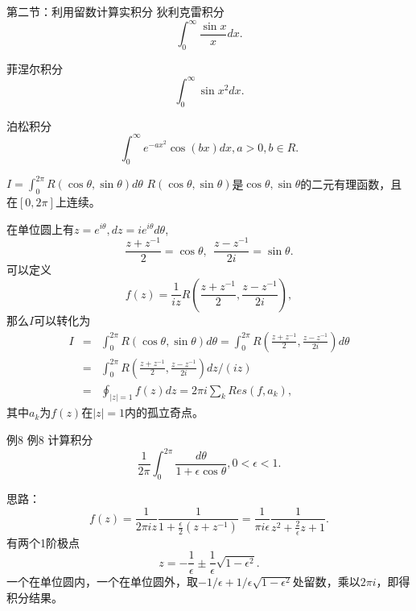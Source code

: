 \documentclass[11pt]{beamer}
\newcommand{\kong}[1][0.5]{\vspace{#1cm}}
\begin{document}
\begin{frame}{第二节：利用留数计算实积分}
狄利克雷积分
\begin{equation}
\int^\infty_0 \frac{\sin x}{x} dx.
\end{equation}

\kong[0.5]
菲涅尔积分
\begin{equation}
\int^\infty_0 \sin x^2 dx.
\end{equation}

\kong[0.5]
泊松积分
\begin{equation}
\int^\infty_0 e^{-ax^2} \cos (bx) dx, a>0, b \in R.
\end{equation}
\end{frame}

\begin{frame}{$I = \int^{2\pi}_0 R(\cos\theta, \sin \theta) d\theta$ }
$R( \cos \theta, \sin \theta )$是$\cos \theta, \sin \theta$的二元有理函数，且在$[0,2\pi]$上连续。

\kong[0.5]
在单位圆上有$z=e^{i\theta}, dz = ie^{i\theta}d\theta$,
\begin{equation}
\frac{z + z^{-1}}{2} = \cos \theta,
~~
\frac{z - z^{-1}}{2i} = \sin \theta.
\end{equation}
可以定义
\begin{equation}
f(z) = \frac{1}{iz} R( \frac{z + z^{-1}}{2}, \frac{z - z^{-1}}{2i} ),
\end{equation}
那么$I$可以转化为
\begin{eqnarray}
I &=& \int^{2\pi}_0 R(\cos\theta, \sin \theta) d\theta 
= \int^{2\pi}_0 R(\frac{z+z^{-1}}{2}, \frac{z - z^{-1}}{2i}) d \theta
\nonumber\\
&=& \int^{2\pi}_0 R(\frac{z+z^{-1}}{2}, \frac{z - z^{-1}}{2i}) dz/(iz) 
\nonumber\\
&=& \oint_{|z|=1} f(z) dz = 2\pi i \sum_k Res(f,a_k),
\end{eqnarray}
其中$a_k$为$f(z)$在$|z|=1$内的孤立奇点。
\end{frame}

\begin{frame}{例8}
例8 计算积分
\begin{equation}
\frac{1}{2\pi} \int^{2\pi}_0 \frac{d\theta}{1+\epsilon \cos \theta}, 0< \epsilon < 1.
\end{equation}

\kong[0.5]
思路： 
\begin{equation}
f(z) = \frac{1}{2\pi iz} \frac{1}{1+\frac{\epsilon}{2}(z+z^{-1})}
=\frac{1}{\pi i \epsilon} \frac{1}{z^2 + \frac{2}{\epsilon} z +1}.
\end{equation}
有两个1阶极点
\begin{equation}
z = - \frac{1}{\epsilon} \pm \frac{1}{\epsilon} \sqrt{1-\epsilon^2}.
\end{equation}
一个在单位圆内，一个在单位圆外，取$-1/\epsilon + 1/\epsilon\sqrt{1-\epsilon^2}$处留数，乘以$2\pi i$，即得积分结果。

\end{frame}
\end{document}
